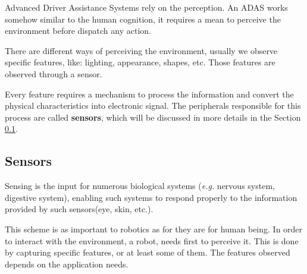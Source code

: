 Advanced Driver Assistance Systems rely on the perception. An ADAS works somehow similar to the human cognition, it requires a mean to perceive the environment before dispatch any action. 

There are different ways of perceiving the environment, usually we observe specific features, like: lighting, appearance, shapes, etc. Those features are observed through a sensor.

Every feature requires a mechanism to process the information and convert the physical characteristics into electronic signal. The peripherals responsible for this process are called \textbf{sensors}, which will be discussed in more details in the Section \ref{sec:sensors}.


\subsection{Sensors}
\label{sec:sensors}


Sensing is the input for numerous biological systems (\textit{e.g.} nervous system, digestive system), enabling such systems to respond properly to the information provided by such sensors(eye, skin, etc.). 

This scheme is as important to robotics as for they are for human being. In order to interact with the environment, a robot, needs first to perceive it. This is done by capturing specific features, or at least some of them. The features observed depends on the application needs.

